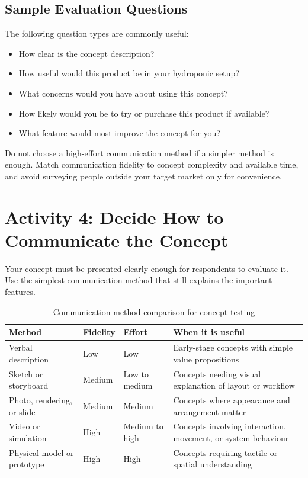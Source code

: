 \subsection{Sample Evaluation Questions}

The following question types are commonly useful:
\begin{itemize}
    \item How clear is the concept description?
    \item How useful would this product be in your hydroponic setup?
    \item What concerns would you have about using this concept?
    \item How likely would you be to try or purchase this product if available?
    \item What feature would most improve the concept for you?
\end{itemize}

\begin{tcolorbox}[title=Common Mistakes]
Do not choose a high-effort communication method if a simpler method is enough. Match communication fidelity to concept complexity and available time, and avoid surveying people outside your target market only for convenience.
\end{tcolorbox}

\section{Activity 4: Decide How to Communicate the Concept}

Your concept must be presented clearly enough for respondents to evaluate it. Use the simplest communication method that still explains the important features.

\begin{table}[htbp]
\centering
\caption{Communication method comparison for concept testing}
\label{tab:session12-communication-matrix}
\renewcommand{\arraystretch}{1.2}
\begin{tabularx}{\textwidth}{|>{\raggedright\arraybackslash}p{}|>{\raggedright\arraybackslash}p{}|>{\raggedright\arraybackslash}p{}|X|}
\hline
\textbf{Method} & \textbf{Fidelity} & \textbf{Effort} & \textbf{When it is useful} \\
\hline
Verbal description & Low & Low & Early-stage concepts with simple value propositions \\
\hline
Sketch or storyboard & Medium & Low to medium & Concepts needing visual explanation of layout or workflow \\
\hline
Photo, rendering, or slide & Medium & Medium & Concepts where appearance and arrangement matter \\
\hline
Video or simulation & High & Medium to high & Concepts involving interaction, movement, or system behaviour \\
\hline
Physical model or prototype & High & High & Concepts requiring tactile or spatial understanding \\
\hline
\end{tabularx}
\end{table}

